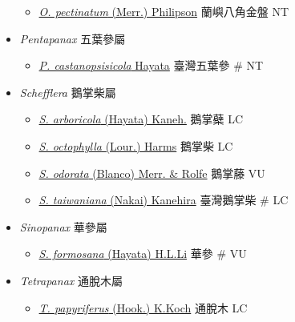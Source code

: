 \begin{itemize}
  \begin{itemize}
        \item[] \href{http://www.theplantlist.org/tpl1.1/search?q=Osmoxylon+pectinatum}{\textit{O. pectinatum} (Merr.) Philipson}   蘭嶼八角金盤   NT
  \end{itemize}
 \item[] \textit{Pentapanax} 五葉參屬
                                
  \begin{itemize}
        \item[] \href{http://www.theplantlist.org/tpl1.1/search?q=Pentapanax+castanopsisicola}{\textit{P. castanopsisicola} Hayata}   臺灣五葉參  \# NT
  \end{itemize}
 \item[] \textit{Schefflera} 鵝掌柴屬
                                
  \begin{itemize}
        \item[] \href{http://www.theplantlist.org/tpl1.1/search?q=Schefflera+arboricola}{\textit{S. arboricola} (Hayata) Kaneh.}   鵝掌蘗   LC
        \item[] \href{http://www.theplantlist.org/tpl1.1/search?q=Schefflera+octophylla}{\textit{S. octophylla} (Lour.) Harms}   鵝掌柴   LC
        \item[] \href{http://www.theplantlist.org/tpl1.1/search?q=Schefflera+odorata}{\textit{S. odorata} (Blanco) Merr. \& Rolfe}   鵝掌藤   VU
        \item[] \href{http://www.theplantlist.org/tpl1.1/search?q=Schefflera+taiwaniana}{\textit{S. taiwaniana} (Nakai) Kanehira}   臺灣鵝掌柴  \# LC
  \end{itemize}
 \item[] \textit{Sinopanax} 華參屬
                                
  \begin{itemize}
        \item[] \href{http://www.theplantlist.org/tpl1.1/search?q=Sinopanax+formosana}{\textit{S. formosana} (Hayata) H.L.Li}   華參  \# VU
  \end{itemize}
 \item[] \textit{Tetrapanax} 通脫木屬
                                
  \begin{itemize}
        \item[] \href{http://www.theplantlist.org/tpl1.1/search?q=Tetrapanax+papyriferus}{\textit{T. papyriferus} (Hook.) K.Koch}   通脫木   LC
  \end{itemize}
  \end{itemize}
